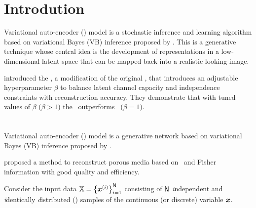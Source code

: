\section{Introdution}

Variational auto-encoder (\VAE) model is a stochastic inference and learning algorithm based on variational Bayes (VB) inference proposed by \cite{kingma2014}.
This is a generative technique whose central idea is the development of representations in a low-dimensional latent space that can be mapped back into a realistic-looking image.

\cite{Higgins2016betaVAELB} introduced the \bVAE, a modification of the original \VAE, that introduces an adjustable hyperparameter $\beta$ to balance latent channel capacity and independence constraints with reconstruction accuracy.
They demonstrate that with tuned values of $\beta$ ($\beta>1$) the \bVAE\ outperforms \VAE\ ($\beta=1$).

\cite{Makhzani2015,louizos2017variational,burda2016importance,Zheng2019,vahdat2020}
\section{\cite{Zhang2022}}

Variational auto-encoder (\VAE) model is a generative network based on variational Bayes (VB) inference proposed by \cite{kingma2014}.

\cite{Zhang2022} proposed a method to reconstruct porous media based on \VAE\ and Fisher information with good quality and efficiency.

Consider the input data $\mathbb{X} = \left\{ \boldsymbol{x}^{(i)} \right\}_{i=1}^{\mathsf{N}}$ consisting of $\mathsf{N}$
\textit{i}ndependent and \textit{i}dentically \textit{d}istributed (\iid) samples of the continuous (or discrete) variable $\boldsymbol{x}$.

\begin{figure}[H]
 \centering
 
\end{figure}

